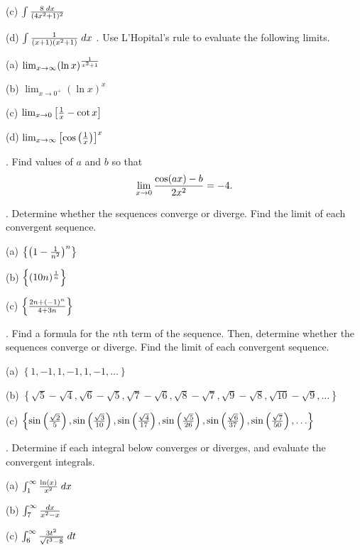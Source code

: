 \documentclass[12pt]{article}
\begin{document}
\noindent (c) $\int {{8 \; dx}\over{(4x^2+1)^2}}$

\noindent (d) $\int {{1}\over{(x+1)(x^2+1)}}\; dx$
\bigskip
{}.  Use L'Hopital's rule to evaluate the following limits.

\noindent (a) $\lim_{x\to\infty}(\ln x)^{{1}\over{x^2+1}}$

\noindent (b) $\lim_{x\to 0^+}(\ln x)^x$

\noindent (c) $\lim_{x \to 0} \left [ {{1}\over{x}} - \cot x 
\right ]$

\noindent (d) $\lim_{x \to \infty} \left [ \cos \left ( {{1}\over{x}} \right ) 
\right ]^x$

\medskip
{}.  Find values of $a$ and $b$ so that
$$\lim_{x \to 0} {{\cos (ax) - b}\over{2x^2}} = -4.$$

\medskip
{}.  Determine whether the sequences converge or diverge. Find the 
limit of each convergent sequence.

\noindent (a) $\left\{ \left (1-{{1}\over{n^2}} \right )^n\right\} $

\noindent (b) $\left\{ (10n)^{{1}\over{n}} \right\}$

\noindent (c) $\left\{ {{2n+(-1)^n}\over{4+3n}} \right\}$

\medskip
{}.  Find a formula for the $n$th term of the sequence. Then, 
determine whether the sequences converge or diverge. Find the limit of each 
convergent sequence.

\noindent (a) $\left\{ 1, -1, 1, -1 ,1,-1, \ldots\right\} $

\noindent (b) $\left\{ \sqrt{5} - \sqrt{4},\sqrt{6} - \sqrt{5},\sqrt{7} - 
\sqrt{6},\sqrt{8} - \sqrt{7},\sqrt{9} - \sqrt{8},\sqrt{10} - 
\sqrt{9},\ldots\right\}$

\noindent (c) $\left\{ 
\sin\left({{\sqrt{2}}\over{5}}\right),\sin\left({{\sqrt{3}}\over{10}}\right),
\sin\left({{\sqrt{4}}\over{17}}\right),\sin\left({{\sqrt{5}}\over{26}}\right),
\sin\left({{\sqrt{6}}\over{37}}\right),\sin\left({{\sqrt{7}}\over{50}}\right),\ldots 
\right\}$

\medskip
{}.  Determine if each integral below converges or diverges, and evaluate 
the convergent integrals.

\noindent (a) $\int_1^{\infty} {{\ln (x)}\over{x^2}} \; dx$

\noindent (b) $\int_7^{\infty} {{dx}\over{x^2-x}}$

\noindent (c) $\int_6^{\infty} {{3t^2}\over{\sqrt{t^3-8}}} \; dt$
\end{document}

